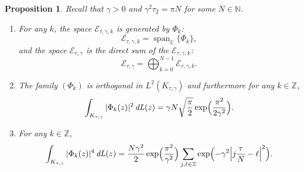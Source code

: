 \documentclass[10pt]{amsart}
\DeclareMathOperator{\dL}{\mathit{dL}}
\newtheorem{prop}[theorem]{Proposition}
\theoremstyle{definition}
\let\EE\exp
\newcommand\C{\mathbb C}
\newcommand\Z{\mathbb Z}
\begin{document}
\begin{prop} \label{prop72} Recall that $\gamma > 0$ and $\gamma^2 \tau_2 = \pi N$ for some $N \in \mathbb{N}$.
\begin{enumerate}
\item\label{prop72i} For any $k$, the space $\mathcal{E}_{\tau,\gamma,k}$ is generated by $\Phi_k$:
\begin{equation*}
\mathcal{E}_{\tau,\gamma,k}= \operatorname{span}_{\C} \bigl\{\Phi_{k}\bigr\},
\end{equation*}
and the space $\mathcal{E}_{\tau,\gamma}$ is the direct sum of the $\mathcal{E}_{\tau,\gamma,k}$:
\begin{equation*}
\mathcal{E}_{\tau,\gamma}=\bigoplus_{k=0}^{N-1} \mathcal{E}_{\tau,\gamma,k}.
\end{equation*}

\item\label{prop72ii} The family $(\Phi_{k})$ is orthogonal in $L^{2}(K_{\tau, \gamma})$ and furthermore for any $k \in \Z$,
\[
\int_{K_{\tau, \gamma}}|\Phi_{k}(z)|^{2} \dL(z)=\gamma N \sqrt{\frac{\pi}{ {2}}} \EE\Bigl(\frac{\pi^2}{2\gamma^2}\Bigr).
\]
\item\label{prop72iii} For any $k \in \Z$,
\begin{equation*}
\int_{K_{\tau, \gamma}} |\Phi_{k}(z)|^4 \dL(z)= \frac{N\gamma^2}2\EE\Bigl(\frac{\pi^2}{ \gamma^2}\Bigr) \sum_{j, \ell\in \Z}\EE\Bigl({-\gamma^2 \Bigl |j\frac{\tau}N-\ell \Bigr|^{2}}\Bigr).
\end{equation*}
\end{enumerate}
\end{prop}
\end{document}

